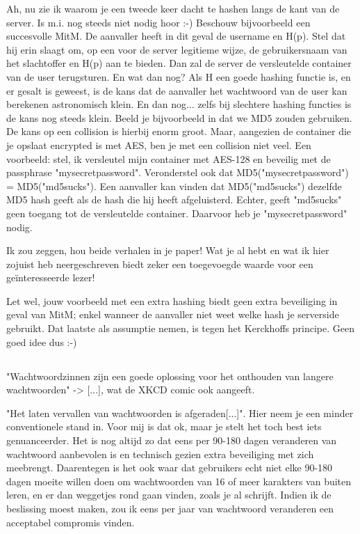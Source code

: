 Ah, nu zie ik waarom je een tweede keer dacht te hashen langs de kant van de
server. Is m.i. nog steeds niet nodig hoor :-) Beschouw bijvoorbeeld een
succesvolle MitM. De aanvaller heeft in dit geval de username en H(p). Stel dat
hij erin slaagt om, op een voor de server legitieme wijze, de gebruikersnaam
van het slachtoffer en H(p) aan te bieden. Dan zal de server de versleutelde
container van de user terugsturen. En wat dan nog? Als H een goede hashing
functie is, en er gesalt is geweest, is de kans dat de aanvaller het wachtwoord
van de user kan berekenen astronomisch klein.
En dan nog... zelfs bij slechtere hashing functies is de kans nog steeds klein.
Beeld je bijvoorbeeld in dat we MD5 zouden gebruiken. De kans op een collision
is hierbij enorm groot. Maar, aangezien de container die je opslaat encrypted
is met AES, ben je met een collision niet veel.
Een voorbeeld: stel, ik versleutel mijn container met AES-128 en beveilig met
de passphrase "mysecretpassword". Veronderstel ook dat MD5("mysecretpassword")
= MD5("md5sucks"). Een aanvaller kan vinden dat MD5("md5sucks") dezelfde MD5
hash geeft als de hash die hij heeft afgeluisterd. Echter, geeft "md5sucks"
geen toegang tot de versleutelde container. Daarvoor heb je "mysecretpassword"
nodig.

Ik zou zeggen, hou beide verhalen in je paper! Wat je al hebt en wat ik hier
zojuist heb neergeschreven biedt zeker een toegevoegde waarde voor een
geïnteresseerde lezer!

Let wel, jouw voorbeeld met een extra hashing biedt geen extra beveiliging in
geval van MitM; enkel wanneer de aanvaller niet weet welke hash je serverside
gebruikt. Dat laatste als assumptie nemen, is tegen het Kerckhoffs principe.
Geen goed idee dus :-)

\subsection{}
"Wachtwoordzinnen zijn een goede oplossing voor het onthouden van langere
wachtwoorden" -> [...], wat de XKCD comic ook aangeeft.

"Het laten vervallen van wachtwoorden is afgeraden[...]". Hier neem je een
minder conventionele stand in. Voor mij is dat ok, maar je stelt het toch best
iets genuanceerder. Het is nog altijd zo dat eens per 90-180 dagen veranderen
van wachtwoord aanbevolen is en technisch gezien extra beveiliging met zich
meebrengt. Daarentegen is het ook waar dat gebruikers echt niet elke 90-180
dagen moeite willen doen om wachtwoorden van 16 of meer karakters van buiten
leren, en er dan weggetjes rond gaan vinden, zoals je al schrijft. Indien ik de
beslissing moest maken, zou ik eens per jaar van wachtwoord veranderen een
acceptabel compromis vinden.

